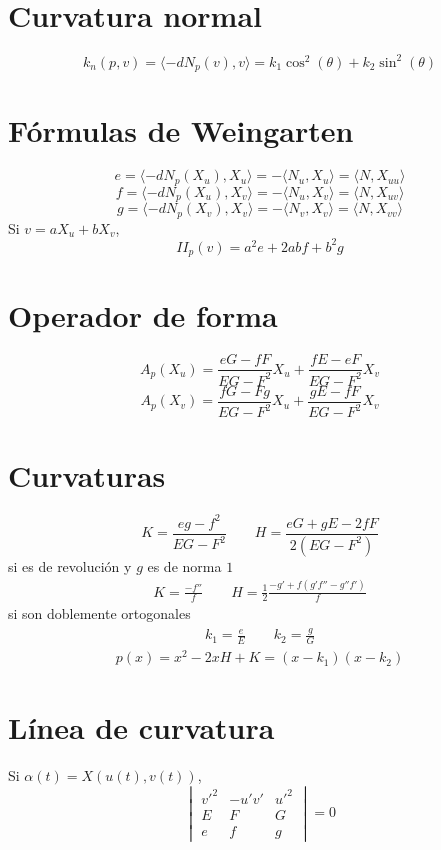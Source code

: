 \documentclass[8pt]{article}
\begin{document}
\tiny
\begin{multicols}{3}

\section*{Curvatura normal}
\[
k_n(p, v) = \langle -dN_p(v), v \rangle = k_1 \cos^2(\theta) + k_2 \sin^2(\theta)
\]

\section*{Fórmulas de Weingarten}
\[
e = \langle -dN_p(X_u), X_u \rangle = - \langle N_u, X_u \rangle = \langle N, X_{uu} \rangle
\]
\[
f = \langle -dN_p(X_u), X_v \rangle = - \langle N_u, X_v \rangle = \langle N, X_{uv} \rangle
\]
\[
g = \langle -dN_p(X_v), X_v \rangle = - \langle N_v, X_v \rangle = \langle N, X_{vv} \rangle
\]
Si $v = aX_u + bX_v$,
\[
II_p(v) = a^2 e + 2abf + b^2 g
\]

\section*{Operador de forma}
\[
A_p(X_u) =
\frac{eG - fF}{EG - F^2} X_u +
\frac{fE - eF}{EG - F^2} X_v
\]
\[
A_p(X_v) =
\frac{fG - Fg}{EG - F^2} X_u +
\frac{gE - fF}{EG - F^2} X_v
\]

\section*{Curvaturas}
\[
K = \frac{eg - f^2}{EG - F^2}
\qquad
H = \frac{eG + gE - 2fF}{2(EG - F^2)}
\]
  si es de revolución y $g$ es de norma $1$ 
\begin{align*}
  K=\frac{-f''}{f} \qquad H=\frac{1}{2}\frac{-g'+f(g'f''-g''f')}{f}
\end{align*}
si son doblemente ortogonales
\begin{align*}
  k_1=\frac{e}{E}\qquad k_2=\frac{g}{G}
\end{align*}
\begin{align*}
  p(x)=x^2-2xH+K=(x-k_1)(x-k_2)
\end{align*}
\section*{Línea de curvatura}
Si $\alpha(t) = X(u(t), v(t))$,
\[
\begin{vmatrix}
v'^2 & -u'v' & u'^2 \\
E & F & G \\
e & f & g
\end{vmatrix} = 0
\]


\end{multicols}
\end{document}
